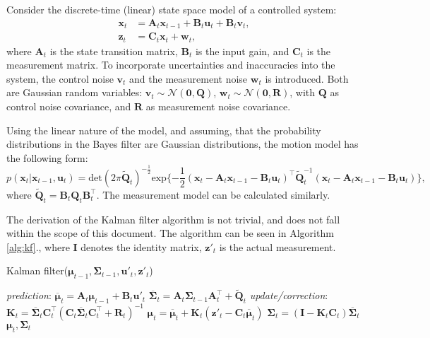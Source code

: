 Consider the discrete-time (linear) state space model of a controlled system:
\begin{align}
  \mathbf{x}_t & = \mathbf{A}_t\mathbf{x}_{t-1} + \mathbf{B}_t\mathbf{u}_t + \mathbf{B}_t\mathbf{v}_t, \\
  \mathbf{z}_t & = \mathbf{C}_t\mathbf{x}_t + \mathbf{w}_t, \label{eq:lin-meas-model}
\end{align}
where $\mathbf{A}_t$ is the state transition matrix, $\mathbf{B}_t$ is the input gain, and $\mathbf{C}_t$ is the measurement matrix. To incorporate uncertainties and inaccuracies into the system,
the control noise $\mathbf{v}_t$ and the measurement noise $\mathbf{w}_t$ is introduced.
Both are Gaussian random variables:
$\mathbf{v}_t \sim \mathcal{N}(\mathbf{0},\mathbf{Q})$, $\mathbf{w}_t \sim \mathcal{N}(\mathbf{0},\mathbf{R})$,
with $\mathbf{Q}$ as control noise covariance, and $\mathbf{R}$ as measurement noise covariance.

Using the linear nature of the model, and assuming, that the probability distributions in the Bayes filter are Gaussian distributions, the motion model has the following form:
\begin{equation}\label{key}
  p(\mathbf{x}_t|\mathbf{x}_{t-1}, \mathbf{u}_t) = \mathrm{det}(2\pi\tilde{\mathbf{Q}}_t)
  ^{-\frac{1}{2}}\mathrm{exp}\{-\frac{1}{2}(\mathbf{x}_t-\mathbf{A}_t\mathbf{x}_{t-1}-
  \mathbf{B}_t\mathbf{u}_t)^\top\tilde{\mathbf{Q}}_t^{-1}(\mathbf{x}_t-\mathbf{A}_t\mathbf{x}_{t-1}-\mathbf{B}_t\mathbf{u}_t)\},
\end{equation}
where $\tilde{\mathbf{Q}}_t = \mathbf{B}_t\mathbf{Q}_t\mathbf{B}_t^{\top}$.
The measurement model can be calculated similarly.

The derivation of the Kalman filter algorithm is not trivial, and does not fall within the scope of this document. The algorithm can be seen in Algorithm \ref{alg:kf}., where $\mathbf{I}$ denotes the identity matrix, $\mathbf{z}'_t$ is the actual measurement.

\begin{algorithm}
  \caption{Kalman filter($\boldsymbol{\mu}_{t-1},\mathbf{\Sigma}_{t-1},\mathbf{u}'_t,\mathbf{z}'_t$)}\label{alg:kf}
  \begin{algorithmic}[1]
    \BState \emph{prediction}:
    \State\indent$\overline{\boldsymbol{\mu}}_t = \mathbf{A}_t{\boldsymbol{\mu}}_{t-1} + \mathbf{B}_t\mathbf{u}'_t$
    \State\indent $\overline{\mathbf{\Sigma}}_t = \mathbf{A}_t\mathbf{\Sigma}_{t-1}\mathbf{A}^\top_t + \tilde{\mathbf{Q}}_t$
    \BState \emph{update/correction}:
    \State\indent $\mathbf{K}_t = \overline{\mathbf{\Sigma}}_t\mathbf{C}_t^\top\left(\mathbf{C}_t\overline{\mathbf{\Sigma}}_t\mathbf{C}_t^\top+\mathbf{R}_t\right)^{-1}$
    \State\indent $\boldsymbol{\mu}_t = \overline{\boldsymbol{\mu}}_t + \mathbf{K}_t\left(\mathbf{z}'_t-\mathbf{C}_t\overline{\boldsymbol{\mu}}_t\right)$
    \State\indent $\mathbf{\Sigma}_t = \left(\mathbf{I}-\mathbf{K}_t\mathbf{C}_t\right)\overline{\mathbf{\Sigma}}_t$
    \State\Return $\boldsymbol{\mu}_t,\mathbf{\Sigma}_t$
  \end{algorithmic}
\end{algorithm}
